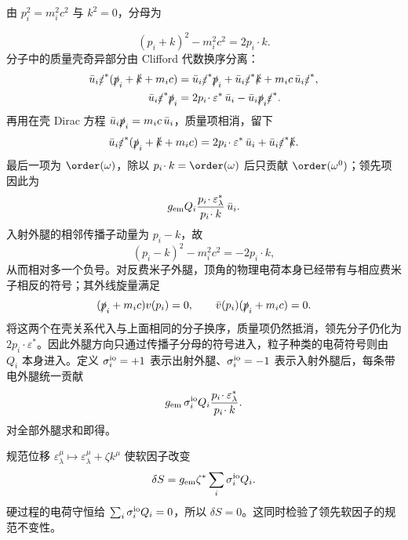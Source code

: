 \begin{derivation}
由 $p_i^2=m_i^2c^2$ 与 $k^2=0$，分母为

\begin{equation*}
 (p_i+k)^2-m_i^2c^2=2p_i\!\cdot k.
\end{equation*}
分子中的质量壳奇异部分由 Clifford 代数换序分离：
\begin{align*}
 \bar u_i\slashed\varepsilon^*(\slashed p_i+\slashed k+m_ic)
 &=\bar u_i\slashed\varepsilon^*\slashed p_i
   +\bar u_i\slashed\varepsilon^*\slashed k
   +m_ic\,\bar u_i\slashed\varepsilon^*,\\
 \bar u_i\slashed\varepsilon^*\slashed p_i
 &=2p_i\!\cdot\varepsilon^*\,\bar u_i
   -\bar u_i\slashed p_i\slashed\varepsilon^*.
\end{align*}
再用在壳 Dirac 方程 $\bar u_i\slashed p_i=m_ic\,\bar u_i$，质量项相消，留下
\begin{equation*}
 \bar u_i\slashed\varepsilon^*(\slashed p_i+\slashed k+m_ic)
 =2p_i\!\cdot\varepsilon^*\,\bar u_i
 +\bar u_i\slashed\varepsilon^*\slashed k.
\end{equation*}
最后一项为 $\order(\omega)$，除以 $p_i\!\cdot k=\order(\omega)$ 后只贡献 $\order(\omega^0)$；领先项因此为
\begin{equation*}
 g_{\rm em}Q_i
 \frac{p_i\!\cdot\varepsilon_\lambda^*}{p_i\!\cdot k}\,\bar u_i.
\end{equation*}
入射外腿的相邻传播子动量为 $p_i-k$，故
\begin{equation*}
 (p_i-k)^2-m_i^2c^2=-2p_i\!\cdot k,
\end{equation*}
从而相对多一个负号。对反费米子外腿，顶角的物理电荷本身已经带有与相应费米子相反的符号；其外线旋量满足
\[
 (\slashed p_i+m_ic)v(p_i)=0,
 \qquad
 \bar v(p_i)(\slashed p_i+m_ic)=0.
\]
将这两个在壳关系代入与上面相同的分子换序，质量项仍然抵消，领先分子仍化为 $2p_i\!\cdot\varepsilon^*$。因此外腿方向只通过传播子分母的符号进入，粒子种类的电荷符号则由 $Q_i$ 本身进入。定义 $\sigma_i^{\rm io}=+1$ 表示出射外腿、$\sigma_i^{\rm io}=-1$ 表示入射外腿后，每条带电外腿统一贡献
\[
 g_{\rm em}\,\sigma_i^{\rm io}Q_i
 \frac{p_i\!\cdot\varepsilon_\lambda^*}{p_i\!\cdot k}.
\]
对全部外腿求和即得。

规范位移 $\varepsilon_\lambda^\mu\mapsto\varepsilon_\lambda^\mu+\zeta k^\mu$ 使软因子改变
\begin{equation*}
 \delta S=g_{\rm em}\zeta^*\sum_i\sigma_i^{\rm io}Q_i.
\end{equation*}
硬过程的电荷守恒给 $\sum_i\sigma_i^{\rm io}Q_i=0$，所以 $\delta S=0$。这同时检验了领先软因子的规范不变性。
\end{derivation}

